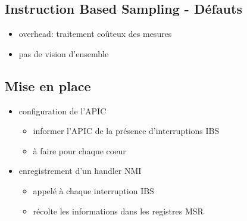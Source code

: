 \documentclass{beamer}
\newcommand{\bframe}{\begin{frame}{\secname}{\subsecname}}
\begin{document}
    \subsection{Instruction Based Sampling - Défauts}
     \bframe
       \begin{itemize}
         \item overhead: traitement coûteux des mesures
         \item pas de vision d'ensemble
       \end{itemize}
     \end{frame}

    \subsection{Mise en place}
      \bframe
        \begin{itemize}
          \item configuration de l'APIC
          \begin{itemize}
            \item informer l'APIC de la présence d'interruptions IBS
            \item à faire pour chaque coeur
          \end{itemize}
          \item enregistrement d'un handler NMI
          \begin{itemize}
            \item appelé à chaque interruption IBS
            \item récolte les informations dans les registres MSR
          \end{itemize}
        \end{itemize}
      \end{frame}
\end{document}
